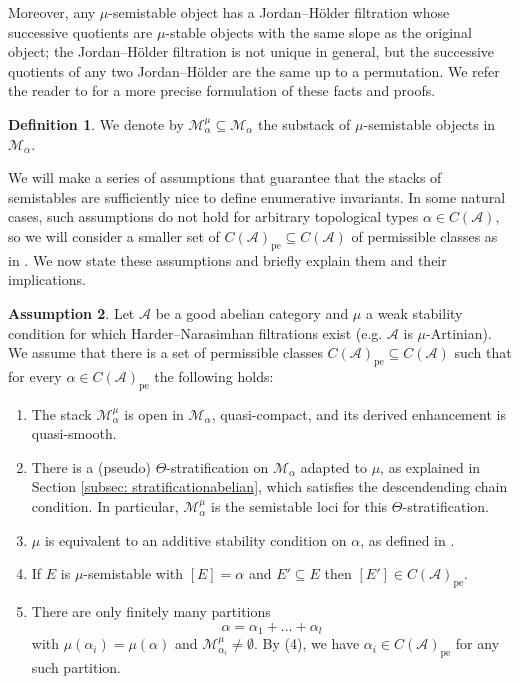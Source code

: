 \documentclass[12pt]{amsart}
\theoremstyle{definition}
\newtheorem{definition}{Definition}[section]
\newtheorem{assumption}[definition]{Assumption}
\newtheorem{remark}[definition]{Remark}
\newcommand{\CA}{{\mathcal A}}
\newcommand{\CM}{{\mathcal M}}
\newcommand{\1}{\mathbf 1}
\newcommand{\pe}{\mathrm{pe}}
\begin{document}
Moreover, any $\mu$-semistable object has a Jordan--Hölder filtration whose successive quotients are $\mu$-stable objects with the same slope as the original object; the Jordan--Hölder filtration is not unique in general, but the successive quotients of any two Jordan--Hölder are the same up to a permutation. We refer the reader to \cite[Theorem 4.4, 4.5]{JO06III} for a more precise formulation of these facts and proofs.



\begin{definition} 
We denote by $\CM^{\mu}_{\alpha}\subseteq \CM_\alpha$ the substack of $\mu$-semistable objects in $\CM_\alpha$.
\end{definition}

We will make a series of assumptions that  guarantee that the stacks of semistables are sufficiently nice to define enumerative invariants. In some natural cases, such assumptions do not hold for arbitrary topological types $\alpha\in C(\CA)$, so we will consider a smaller set of $C(\CA)_\pe\subseteq C(\CA)$ of permissible classes as in \cite[Assumption 5.1(e)]{joyce}. We now state these assumptions and briefly explain them and their implications.

\begin{assumption}\label{ass: stability}
    Let $\CA$ be a good abelian category and $\mu$ a weak stability condition for which Harder--Narasimhan filtrations exist (e.g. $\CA$ is $\mu$-Artinian). We assume that there is a set of permissible classes $C(\CA)_{\pe}\subseteq C(\CA)$ such that for every $\alpha\in C(\CA)_{\pe}$ the following holds:
\begin{enumerate}
        \item The stack $\CM_\alpha^\mu$ is open in $\CM_\alpha$, quasi-compact, and its derived enhancement is quasi-smooth.
        \item There is a (pseudo) $\Theta$-stratification on $\CM_\alpha$ adapted to $\mu$, as explained in Section \ref{subsec: stratificationabelian}, which satisfies the descendending chain condition. In particular, $\CM_\alpha^\mu$ is the semistable loci for this $\Theta$-stratification.
        \item $\mu$ is equivalent to an additive stability condition on $\alpha$, as defined in \cite[Section 7.3]{AHLH}.
        \item If $E$ is $\mu$-semistable with $[E]=\alpha$ and $E'\subseteq E$ then $[E']\in C(\CA)_\pe$.
        \item There are only finitely many partitions
        \[\alpha=\alpha_1+\ldots+\alpha_l\]
        with $\mu(\alpha_i)=\mu(\alpha)$ and $\CM_{\alpha_i}^\mu\neq \emptyset$. By (4), we have $\alpha_i\in C(\CA)_{\pe}$ for any such partition. 
\end{enumerate}
\end{assumption}
\end{document}
